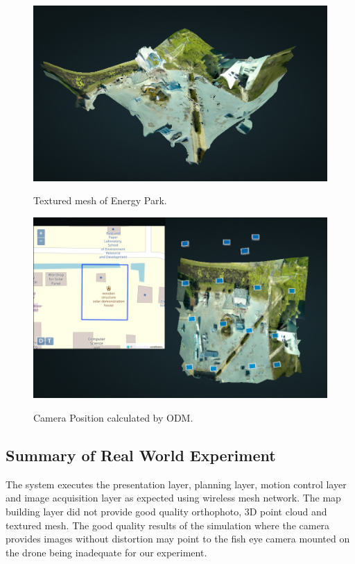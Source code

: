 \begin{figure}
	\centering
	\caption[Textured mesh of Energy Park.]{\small Textured mesh of Energy Park.} 
	\includegraphics[width=5in]{figures/experiment/textured-mesh-real}
	\label{fig:real-textured-map}
\end{figure}

\begin{figure}
	\centering
	\caption[Camera Position calculated by ODM.]{\small Camera Position calculated by ODM.} 
	\includegraphics[width=5in]{figures/experiment/camera-position-real}
	\label{fig:real-camera-position}
\end{figure}

\subsection{Summary of Real World Experiment}

The system executes the presentation layer, planning layer, motion control layer and image acquisition layer as expected using wireless mesh network. The map building layer did not provide good quality orthophoto, 3D point cloud and textured mesh. The good quality results of the simulation where the camera provides images without distortion may point to the fish eye camera mounted on the drone being inadequate for our experiment.



